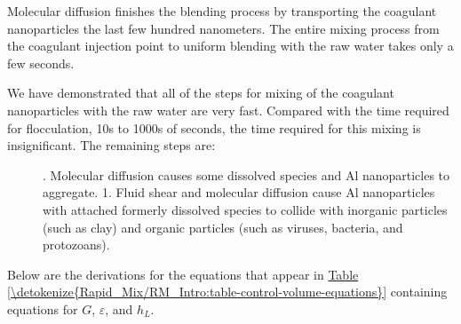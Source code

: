\documentclass[letterpaper,10pt,english]{sphinxmanual}
\begin{document}
Molecular diffusion finishes the blending process by transporting the coagulant nanoparticles the last few hundred nanometers. The entire mixing process from the coagulant injection point to uniform blending with the raw water takes only a few seconds.
\begin{description}
\item[{We have demonstrated that all of the steps for mixing of the coagulant nanoparticles with the raw water are very fast. Compared with the time required for flocculation, 10s to 1000s of seconds, the time required for this mixing is insignificant. The remaining steps are:}] . Molecular diffusion causes some dissolved species and Al nanoparticles to aggregate.
1. Fluid shear and molecular diffusion cause Al nanoparticles with attached formerly dissolved species to collide with inorganic particles (such as clay) and organic particles (such as viruses, bacteria, and protozoans).

\end{description}

Below are the derivations for the equations that appear in \hyperref[\detokenize{Rapid_Mix/RM_Intro:table-control-volume-equations}]{Table \ref{\detokenize{Rapid_Mix/RM_Intro:table-control-volume-equations}}} containing equations for \(G\), \(\varepsilon\), and \(h_L\).
\end{document}
